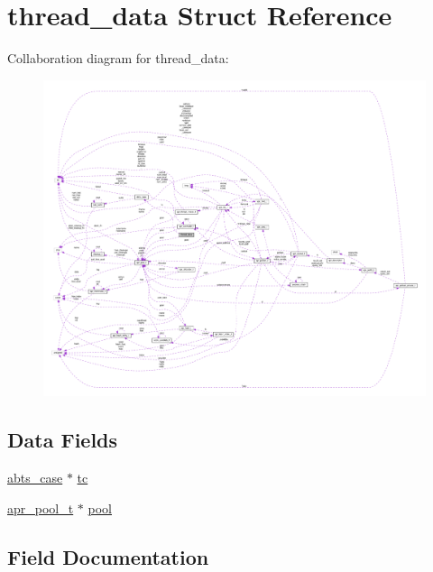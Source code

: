 \hypertarget{structthread__data}{}\section{thread\+\_\+data Struct Reference}
\label{structthread__data}


Collaboration diagram for thread\+\_\+data\+:
\nopagebreak
\begin{figure}[H]
\begin{center}
\leavevmode
\includegraphics[width=350pt]{structthread__data__coll__graph}
\end{center}
\end{figure}
\subsection*{Data Fields}
\begin{DoxyCompactItemize}
\item 
\hyperlink{structabts__case}{abts\+\_\+case} $\ast$ \hyperlink{structthread__data_a7861c2b5f37bf9c92bc4713eb0374095}{tc}
\item 
\hyperlink{structapr__pool__t}{apr\+\_\+pool\+\_\+t} $\ast$ \hyperlink{structthread__data_a93122c8e067656f337610091e15b9eb1}{pool}
\end{DoxyCompactItemize}


\subsection{Field Documentation}
